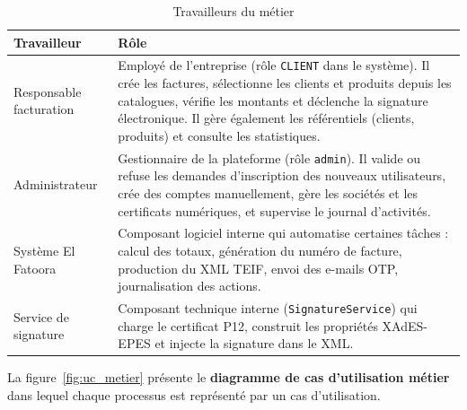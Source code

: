 \documentclass[a4paper,12pt]{report}
\begin{document}
\begin{table}[htbp]
\centering
\caption{Travailleurs du métier}
\label{tab:travailleurs}
\begin{tabularx}{\textwidth}{|l|X|}
\hline
\textbf{Travailleur} & \textbf{Rôle} \\
\hline
Responsable facturation & Employé de l'entreprise (rôle \texttt{CLIENT} dans le système). Il crée les factures, sélectionne les clients et produits depuis les catalogues, vérifie les montants et déclenche la signature électronique. Il gère également les référentiels (clients, produits) et consulte les statistiques. \\
\hline
Administrateur & Gestionnaire de la plateforme (rôle \texttt{admin}). Il valide ou refuse les demandes d'inscription des nouveaux utilisateurs, crée des comptes manuellement, gère les sociétés et les certificats numériques, et supervise le journal d'activités. \\
\hline
Système El Fatoora & Composant logiciel interne qui automatise certaines tâches : calcul des totaux, génération du numéro de facture, production du XML TEIF, envoi des e-mails OTP, journalisation des actions. \\
\hline
Service de signature & Composant technique interne (\texttt{SignatureService}) qui charge le certificat P12, construit les propriétés XAdES-EPES et injecte la signature dans le XML. \\
\hline
\end{tabularx}
\end{table}

La figure~\ref{fig:uc_metier} présente le \textbf{diagramme de cas d'utilisation métier} dans lequel chaque processus est représenté par un cas d'utilisation.
\end{document}
